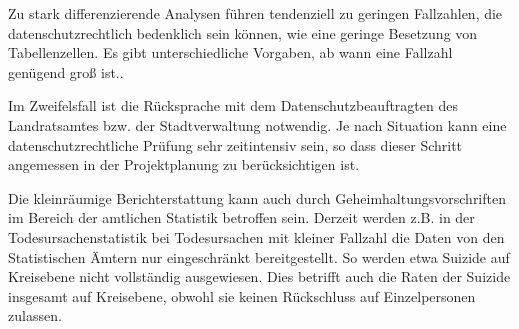 \documentclass{article}
\begin{document}
Zu stark differenzierende Analysen führen tendenziell zu geringen Fallzahlen, die datenschutzrechtlich bedenklich sein können, wie eine geringe Besetzung von Tabellenzellen. Es gibt unterschiedliche Vorgaben, ab wann eine Fallzahl genügend groß ist..


Im Zweifelsfall ist die Rücksprache mit dem Datenschutzbeauftragten des Landratsamtes bzw. der Stadtverwaltung notwendig. Je nach Situation kann eine datenschutzrechtliche Prüfung sehr zeitintensiv sein, so dass dieser Schritt angemessen in der Projektplanung zu berücksichtigen ist. 


Die kleinräumige Berichterstattung kann auch durch Geheimhaltungsvorschriften im Bereich der amtlichen Statistik betroffen sein. Derzeit werden z.B. in der Todesursachenstatistik bei Todesursachen mit kleiner Fallzahl die Daten von den Statistischen Ämtern nur eingeschränkt bereitgestellt. So werden etwa Suizide auf Kreisebene nicht vollständig ausgewiesen. Dies betrifft auch die Raten der Suizide insgesamt auf Kreisebene, obwohl sie keinen Rückschluss auf Einzelpersonen zulassen.
\end{document}
